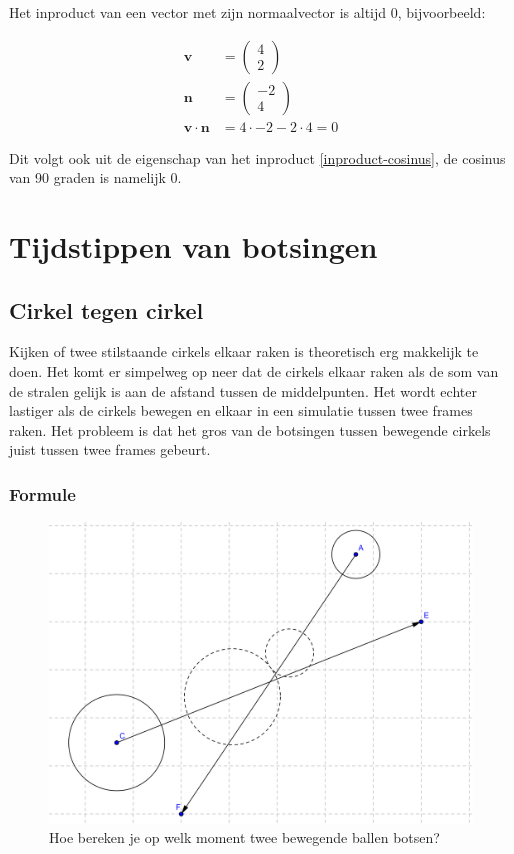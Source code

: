 \documentclass[12pt,a4paper]{article}
\begin{document}
	Het inproduct van een vector met zijn normaalvector is altijd 0, bijvoorbeeld:
	
	\begin{equation}
		\begin{aligned}
			\mathbf{v} &= \begin{pmatrix} 4 \\ 2 \end{pmatrix}\\
			\mathbf{n} &= \begin{pmatrix} -2 \\ 4 \end{pmatrix} \\
			\mathbf{v} \cdot \mathbf{n} &= 4 \cdot -2 - 2 \cdot 4 = 0
		\end{aligned}
	\end{equation}
	
	Dit volgt ook uit de eigenschap van het inproduct \eqref{inproduct-cosinus}, de cosinus van 90 graden is namelijk 0.

	\newpage

	\section{Tijdstippen van botsingen}
	
	\subsection{Cirkel tegen cirkel}
	Kijken of twee stilstaande cirkels elkaar raken is theoretisch erg makkelijk te doen. Het komt er simpelweg op neer dat de cirkels elkaar raken als de som van de stralen gelijk is aan de afstand tussen de middelpunten. Het wordt echter lastiger als de cirkels bewegen en elkaar in een simulatie tussen twee frames raken. Het probleem is dat het gros van de botsingen tussen bewegende cirkels juist tussen twee frames gebeurt.
	
	\subsubsection{Formule}
	\begin{figure}[h]
		\centerline{\includegraphics[width=\textwidth]{Plaatjes/Bal-Bal.png}}
		\caption{Hoe bereken je op welk moment twee bewegende ballen botsen?}
		\label{bal-bal}
	\end{figure}
	
\end{document}
